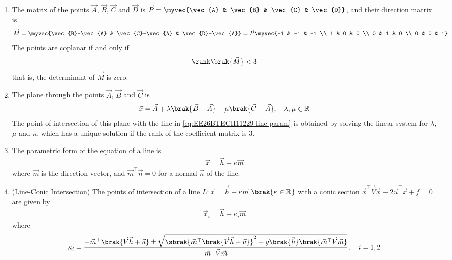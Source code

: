 \begin{enumerate}[label=\thesubsection.\arabic*, ref=\thesubsection.\theenumi]
\item The matrix of the points $\vec{A}$, $\vec{B}$, $\vec{C}$ and $\vec{D}$ is $\vec{P} = \myvec{\vec{A} & \vec{B} & \vec{C} & \vec{D}}$, and their direction matrix is
\begin{align}
	\vec{M} = \myvec{\vec{B}-\vec{A} & \vec{C}-\vec{A} & \vec{D}-\vec{A}} = \vec{P}\myvec{-1 & -1 & -1 \\ 1 & 0 & 0 \\ 0 & 1 & 0 \\ 0 & 0 & 1}
	\label{eq:EE26BTECH11229-coplanar}
\end{align}
The points are coplanar if and only if
\begin{align}
	\rank\brak{\vec{M}} < 3
\end{align}
that is, the determinant of $\vec{M}$ is zero.
\item The plane through the points $\vec{A}$, $\vec{B}$ and $\vec{C}$ is
\begin{align}
	\vec{x} = \vec{A} + \lambda\brak{\vec{B}-\vec{A}} + \mu\brak{\vec{C}-\vec{A}}, \quad \lambda, \mu \in \mathbb{R}
	\label{eq:EE26BTECH11229-plane-param}
\end{align}
The point of intersection of this plane with the line in \eqref{eq:EE26BTECH11229-line-param} is obtained by solving the linear system for $\lambda$, $\mu$ and $\kappa$, which has a unique solution if the rank of the coefficient matrix is $3$.
\item The parametric form of the equation of a line is
\begin{align}
	\vec{x} = \vec{h} + \kappa\vec{m}
	\label{eq:EE26BTECH11229-line-param}
\end{align}
where $\vec{m}$ is the direction vector, and $\vec{m}^{\top}\vec{n} = 0$ for a normal $\vec{n}$ of the line.
\item (Line-Conic Intersection) The points of intersection of a line $L: \vec{x} = \vec{h} + \kappa\vec{m}$ $\brak{\kappa \in \mathbb{R}}$ with a conic section $\vec{x}^{\top}\vec{V}\vec{x} + 2\vec{u}^{\top}\vec{x} + f = 0$ are given by
\begin{align}
	\vec{x}_i = \vec{h} + \kappa_i\vec{m}
	\label{eq:EE26BTECH11229-line-conic}
\end{align}
where
\begin{align}
	\kappa_i = \frac{-\vec{m}^{\top}\brak{\vec{V}\vec{h} + \vec{u}} \pm \sqrt{\sbrak{\vec{m}^{\top}\brak{\vec{V}\vec{h} + \vec{u}}}^2 - g\brak{\vec{h}}\brak{\vec{m}^{\top}\vec{V}\vec{m}}}}{\vec{m}^{\top}\vec{V}\vec{m}}, \quad i = 1, 2
\end{align}

\end{enumerate}
